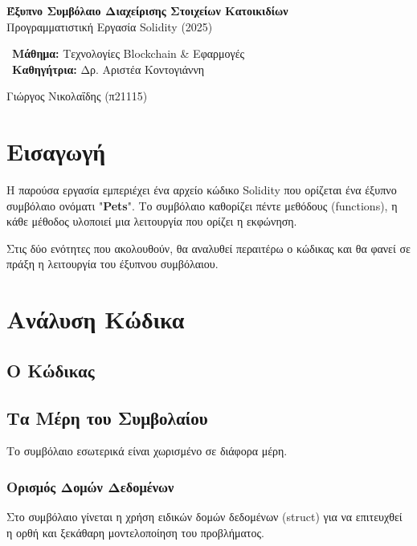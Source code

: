\documentclass[12pt,a4paper]{article}
\begin{document}


\begin{titlepage}
    \centering
    \vspace*{2cm}
    
    {\huge\textbf{Έξυπνο Συμβόλαιο Διαχείρισης Στοιχείων Κατοικιδίων}}\\
    \vspace{2cm}
    {\large Προγραμματιστική Εργασία Solidity (2025)}
    \vspace{3cm}
    
    {\large\ \textbf{Μάθημα:} Τεχνολογίες Blockchain \& Εφαρμογές}\\
    {\large\ \textbf{Καθηγήτρια:} Δρ. Αριστέα Κοντογιάννη}\\
    \vspace{2cm}
    
    {\large Γιώργος Νικολαΐδης (π21115)}\\
\end{titlepage}

\tableofcontents
\newpage

\section{Εισαγωγή}
Η παρούσα εργασία εμπεριέχει ένα αρχείο κώδικο Solidity που ορίζεται ένα έξυπνο συμβόλαιο ονόματι "\textbf{Pets}". Το συμβόλαιο καθορίζει πέντε μεθόδους (functions), η κάθε μέθοδος υλοποιεί μια λειτουργία που ορίζει η εκφώνηση. 

Στις δύο ενότητες που ακολουθούν, θα αναλυθεί περαιτέρω ο κώδικας και θα φανεί σε πράξη η λειτουργία του έξυπνου συμβόλαιου.

\newpage

\section{Ανάλυση Κώδικα}

\subsection{Ο Κώδικας}


\subsection{Τα Μέρη του Συμβολαίου}
Το συμβόλαιο εσωτερικά είναι χωρισμένο σε διάφορα μέρη.

\subsubsection{Ορισμός Δομών Δεδομένων}
Στο συμβόλαιο γίνεται η χρήση ειδικών δομών δεδομένων (struct) για να επιτευχθεί η ορθή και ξεκάθαρη μοντελοποίηση του προβλήματος.
\end{document}
